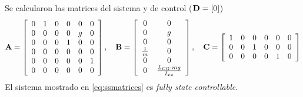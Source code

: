 Se calcularon las matrices del sistema y de control ($\mathbf{D} = [0]$)
\begin{equation} \label{eq:ssmatrices}
	\mathbf{A} = 
	\left[\begin{array}{cccccc} 0 & 1 & 0 & 0 & 0 & 0\\ 0 & 0 & 0 & 0 & g & 0\\ 0 & 0 & 0 & 1 & 0 & 0\\ 0 & 0 & 0 & 0 & 0 & 0\\ 0 & 0 & 0 & 0 & 0 & 1\\ 0 & 0 & 0 & 0 & 0 & 0 \end{array}\right],\quad \mathbf{B} = 
	\left[\begin{array}{cc} 0 & 0\\ 0 & g\\ 0 & 0\\ \frac{1}{m} & 0\\ 0 & 0\\ 0 & \frac{L_{\mathrm{CG}} \cdot mg}{I_{xx}} \end{array}\right], \quad \mathbf{C} =  \left[\begin{array}{cccccc} 1 & 0 & 0 & 0 & 0 & 0\\ 0 & 0 & 1 & 0 & 0 & 0\\ 0 & 0 & 0 & 0 & 1 & 0 \end{array}\right]
\end{equation}
El sistema mostrado en \eqref{eq:ssmatrices} es \textit{fully state controllable}.